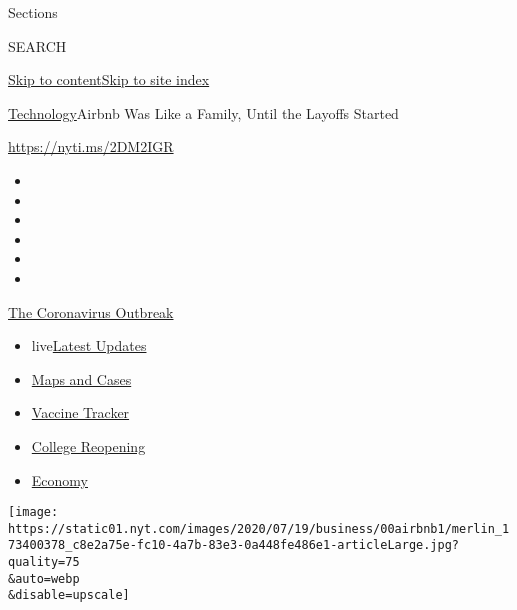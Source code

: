 Sections

SEARCH

\protect\hyperlink{site-content}{Skip to
content}\protect\hyperlink{site-index}{Skip to site index}

\href{/section/technology}{Technology}\textbar{}Airbnb Was Like a
Family, Until the Layoffs Started

\url{https://nyti.ms/2DM2IGR}

\begin{itemize}
\item
\item
\item
\item
\item
\item
\end{itemize}

\href{https://www.nytimes.com/news-event/coronavirus?action=click\&pgtype=Article\&state=default\&region=TOP_BANNER\&context=storylines_menu}{The
Coronavirus Outbreak}

\begin{itemize}
\tightlist
\item
  live\href{https://www.nytimes.com/2020/08/04/world/coronavirus-cases.html?action=click\&pgtype=Article\&state=default\&region=TOP_BANNER\&context=storylines_menu}{Latest
  Updates}
\item
  \href{https://www.nytimes.com/interactive/2020/us/coronavirus-us-cases.html?action=click\&pgtype=Article\&state=default\&region=TOP_BANNER\&context=storylines_menu}{Maps
  and Cases}
\item
  \href{https://www.nytimes.com/interactive/2020/science/coronavirus-vaccine-tracker.html?action=click\&pgtype=Article\&state=default\&region=TOP_BANNER\&context=storylines_menu}{Vaccine
  Tracker}
\item
  \href{https://www.nytimes.com/2020/08/02/us/covid-college-reopening.html?action=click\&pgtype=Article\&state=default\&region=TOP_BANNER\&context=storylines_menu}{College
  Reopening}
\item
  \href{https://www.nytimes.com/live/2020/08/04/business/stock-market-today-coronavirus?action=click\&pgtype=Article\&state=default\&region=TOP_BANNER\&context=storylines_menu}{Economy}
\end{itemize}

\texttt{[image: https://static01.nyt.com/images/2020/07/19/business/00airbnb1/merlin\_173400378\_c8e2a75e-fc10-4a7b-83e3-0a448fe486e1-articleLarge.jpg?quality=75\\\&auto=webp\\\&disable=upscale]}

